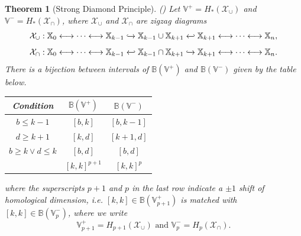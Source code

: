 \documentclass[11pt]{article}
\newtheorem{theorem}{Theorem}[section]
\theoremstyle{remark}
\newcommand{\V}{\mathbb{V}}
\newcommand{\X}{\mathbb{X}}
\newcommand{\B}{\mathbb{B}}
\begin{document}
\begin{theorem}[Strong Diamond Principle](\autocite[Theorem~ 5.9]{carlsson2008zigzag}) 
Let $\V^+=H_*(\mathcal{X}_{\cup})$ and $\V^-=H_*(\mathcal{X}_{\cap})$, where $\mathcal{X}_{\cup}$ and $\mathcal{X}_{\cap}$ are zigzag diagrams 
$$\mathcal{X}_{\cup}:\X_0\longleftrightarrow \cdots\longleftrightarrow \X_{k-1}\xhookrightarrow{} \X_{k-1}\cup \X_{k+1}\xhookleftarrow{} \X_{k+1}\longleftrightarrow\cdots\longleftrightarrow \X_n,$$
$$\mathcal{X}_{\cap}:\X_0\longleftrightarrow \cdots\longleftrightarrow \X_{k-1}\xhookleftarrow{} \X_{k-1}\cap \X_{k+1} \xhookrightarrow{} \X_{k+1}\longleftrightarrow\cdots\longleftrightarrow \X_n.$$
There is a bijection between intervals of $\B({\V^+})$ and $\B({\V^-})$ given by the table below.
\begin{center}
\begin{tabular}{|c c c|} 
 \hline
Condition & $\B({\V^+})$ & $\B({\V^-})$\\ [0.5ex] 
 \hline
 $b\leq k-1$ & $[b,k]$ & $[b,k-1]$ \\ 
\hline
 $d\geq k+1$ & $[k,d]$ & $[k+1,d]$\\
 \hline
 $b\geq k\lor d\leq k$ & $[b, d]$ & $[b, d]$ \\
 \hline
  & $[k, k]^{p+1}$ & $[k, k]^{p}$\\
 \hline
\end{tabular}
\end{center}
where the superscripts $p+1$ and $p$ in the last row indicate a $\pm 1$ shift of homological dimension, \textit{i.e.} $[k,k]\in \B({\V_{p+1}^+})$ is matched with $[k,k]\in \B({\V_p^-})$, where we write  $$\V_{p+1}^+=H_{p+1}(\mathcal{X}_{\cup})\text{ and } \V_{p}^-=H_{p}(\mathcal{X}_{\cap}).$$
\end{theorem}
\end{document}
